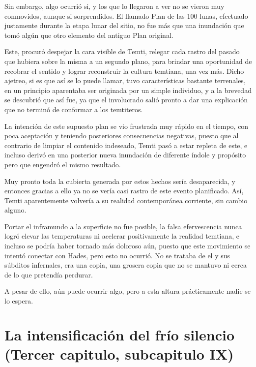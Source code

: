 \documentclass[
  spanish,
]{book}
\begin{document}
Sin embargo, algo ocurrió si, y los que lo llegaron a ver no se vieron muy conmovidos, aunque si sorprendidos. El llamado Plan de las 100 lunas, efectuado justamente durante la etapa lunar del sitio, no fue más que una inundación que tomó algún que otro elemento del antiguo Plan original.

Este, procuró despejar la cara visible de Temti, relegar cada rastro del pasado que hubiera sobre la misma a un segundo plano, para brindar una oportunidad de recobrar el sentido y lograr reconstruir la cultura temtiana, una vez más. Dicho ajetreo, si es que así se lo puede llamar, tuvo características bastante terrenales, en un principio aparentaba ser originada por un simple individuo, y a la brevedad se descubrió que así fue, ya que el involucrado salió pronto a dar una explicación que no terminó de conformar a los temtiteros.

La intención de este supuesto plan se vio frustrada muy rápido en el tiempo, con poca aceptación y teniendo posteriores consecuencias negativas, puesto que al contrario de limpiar el contenido indeseado, Temti pasó a estar repleta de este, e incluso derivó en una posterior nueva inundación de diferente índole y propósito pero que engendró el mismo resultado.

Muy pronto toda la cubierta generada por estos hechos sería desaparecida, y entonces gracias a ello ya no se vería casi rastro de este evento planificado. Así, Temti aparentemente volvería a su realidad contemporánea corriente, sin cambio alguno.

Portar el inframundo a la superficie no fue posible, la falsa efervescencia nunca logró elevar las temperaturas ni acelerar positivamente la realidad temtiana, e incluso se podría haber tornado más doloroso aún, puesto que este movimiento se intentó conectar con Hades, pero esto no ocurrió. No se trataba de el y sus súbditos infernales, era una copia, una grosera copia que no se mantuvo ni cerca de lo que pretendía perdurar.

A pesar de ello, aún puede ocurrir algo, pero a esta altura prácticamente nadie se lo espera.

\hypertarget{la-intensificaciuxf3n-del-fruxedo-silencio-tercer-capitulo-subcapitulo-ix}{%
\section{La intensificación del frío silencio (Tercer capitulo, subcapitulo IX)}\label{la-intensificaciuxf3n-del-fruxedo-silencio-tercer-capitulo-subcapitulo-ix}}
\end{document}

